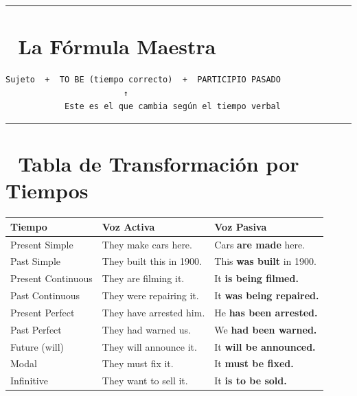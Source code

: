 \documentclass[
  spanish,
  letterpaper,
]{scrbook}
\begin{document}
\begin{center}\rule{0.5\linewidth}{0.5pt}\end{center}

\section{📐 La Fórmula Maestra}\label{la-fuxf3rmula-maestra}

\begin{verbatim}
Sujeto  +  TO BE (tiempo correcto)  +  PARTICIPIO PASADO
                        ↑
            Este es el que cambia según el tiempo verbal
\end{verbatim}

\begin{center}\rule{0.5\linewidth}{0.5pt}\end{center}

\section{📐 Tabla de Transformación por
Tiempos}\label{tabla-de-transformaciuxf3n-por-tiempos}

\begin{longtable}[]{@{}
  >{\raggedright\arraybackslash}p{}
  >{\raggedright\arraybackslash}p{}
  >{\raggedright\arraybackslash}p{}@{}}
\toprule\noalign{}
\begin{minipage}[b]{\linewidth}\raggedright
Tiempo
\end{minipage} & \begin{minipage}[b]{\linewidth}\raggedright
Voz Activa
\end{minipage} & \begin{minipage}[b]{\linewidth}\raggedright
Voz Pasiva
\end{minipage} \\
\midrule\noalign{}
\endhead
\bottomrule\noalign{}
\endlastfoot
Present Simple & They make cars here. & Cars \textbf{are made} here. \\
Past Simple & They built this in 1900. & This \textbf{was built} in
1900. \\
Present Continuous & They are filming it. & It \textbf{is being
filmed.} \\
Past Continuous & They were repairing it. & It \textbf{was being
repaired.} \\
Present Perfect & They have arrested him. & He \textbf{has been
arrested.} \\
Past Perfect & They had warned us. & We \textbf{had been warned.} \\
Future (will) & They will announce it. & It \textbf{will be
announced.} \\
Modal & They must fix it. & It \textbf{must be fixed.} \\
Infinitive & They want to sell it. & It \textbf{is to be sold.} \\
\end{longtable}
\end{document}
